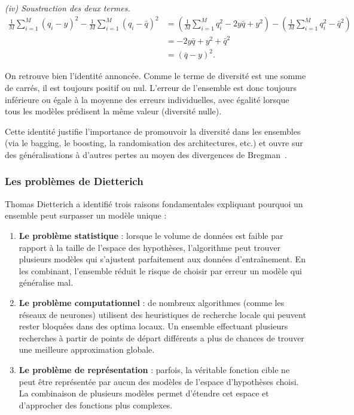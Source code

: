 \emph{(iv) Soustraction des deux termes.}
\begin{align}
  \frac{1}{M} \sum_{i=1}^M (q_i - y)^2
  - \frac{1}{M} \sum_{i=1}^M (q_i - \bar{q})^2
  &= \left( \frac{1}{M} \sum_{i=1}^M q_i^2 - 2 y \bar{q} + y^2 \right)
   - \left( \frac{1}{M} \sum_{i=1}^M q_i^2 - \bar{q}^2 \right) \\
  &= - 2 y \bar{q} + y^2 + \bar{q}^2 \\
  &= (\bar{q} - y)^2.
\end{align}

On retrouve bien l'identit{\'e} annonc{\'e}e. Comme le terme de diversit{\'e} est une somme de carr{\'e}s,
il est toujours positif ou nul. L'erreur de l'ensemble est donc toujours inf{\'e}rieure ou {\'e}gale
{\`a} la moyenne des erreurs individuelles, avec {\'e}galit{\'e} lorsque tous les mod{\`e}les pr{\'e}disent la m{\^e}me
valeur (diversit{\'e} nulle).

Cette identit{\'e} justifie l'importance
de promouvoir la diversit{\'e} dans les ensembles (via le bagging, le boosting, la randomisation
des architectures, etc.) et ouvre sur des g{\'e}n{\'e}ralisations {\`a} d'autres pertes au moyen des divergences
de Bregman~\cite{kuncheva_diversity_ensemble}.

\subsubsection{Les problèmes de Dietterich}

Thomas Dietterich a identifié trois raisons fondamentales expliquant pourquoi un ensemble
peut surpasser un modèle unique :

\begin{enumerate}
  \item \textbf{Le problème statistique} : lorsque le volume de données est faible par rapport à la taille
  de l'espace des hypothèses, l'algorithme peut trouver plusieurs modèles qui s'ajustent
  parfaitement aux données d'entraînement. En les combinant, l'ensemble réduit le risque
  de choisir par erreur un modèle qui généralise mal.

  \item \textbf{Le problème computationnel} : de nombreux algorithmes (comme les réseaux de
  neurones) utilisent des heuristiques de recherche locale qui peuvent rester bloquées
  dans des optima locaux. Un ensemble effectuant plusieurs recherches à partir de points
  de départ différents a plus de chances de trouver une meilleure approximation globale.

  \item \textbf{Le problème de représentation} : parfois, la véritable fonction cible ne peut être
  représentée par aucun des modèles de l'espace d'hypothèses choisi. La combinaison de
  plusieurs modèles permet d'étendre cet espace et d'approcher des fonctions plus
  complexes.
\end{enumerate}

